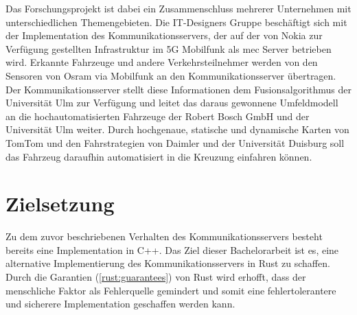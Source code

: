 Das Forschungsprojekt ist dabei ein Zusammenschluss mehrerer Unternehmen mit unterschiedlichen Themengebieten.
Die IT-Designers Gruppe beschäftigt sich mit der Implementation des Kommunikationsservers, der auf der von Nokia zur Verfügung gestellten Infrastruktur im 5G Mobilfunk als \gls{mec} Server betrieben wird.
Erkannte Fahrzeuge und andere Verkehrsteilnehmer werden von den Sensoren von Osram via Mobilfunk an den Kommunikationsserver übertragen.
Der Kommunikationsserver stellt diese Informationen dem Fusionsalgorithmus der Universität Ulm zur Verfügung und leitet das daraus gewonnene Umfeldmodell an die hochautomatisierten Fahrzeuge der Robert Bosch GmbH  und der Universität Ulm weiter.
Durch hochgenaue, statische und dynamische Karten von TomTom und den Fahrstrategien von Daimler und der Universität Duisburg soll das Fahrzeug daraufhin automatisiert in die Kreuzung einfahren können.



\section{Zielsetzung}

Zu dem zuvor beschriebenen Verhalten des Kommunikationsservers besteht bereits eine Implementation in C++.
Das Ziel dieser Bachelorarbeit ist es, eine alternative Implementierung des Kommunikationsservers in Rust zu schaffen.
Durch die Garantien (\autoref{rust:guarantees}) von Rust wird erhofft, dass der menschliche Faktor als Fehlerquelle gemindert und somit eine fehlertolerantere und sicherere Implementation geschaffen werden kann.

